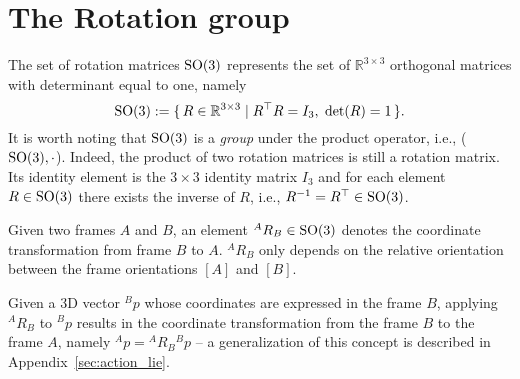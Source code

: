 \section{The Rotation group \label{sec:so3}}
The set of rotation matrices $\mathrm{SO}(3)$ represents the set of $\mathbb{R}^{3 \times 3}$ orthogonal matrices with determinant equal to one, namely
\begin{equation}
\label{eq:so3_definition}
\mathrm{SO}(3) :=  \{\, R \in \mathbb{R}^{3 \times 3} \mid R^\top R = I_3 , \hspace{0.3em} \operatorname{det}(R) = 1 \,\}.
\end{equation}
It is worth noting that $\mathrm{SO}(3)$ is a \emph{group} under the product operator, i.e., ($\mathrm{SO}(3), \cdot$). Indeed, the product of two rotation matrices is still a rotation matrix. 
Its identity element is the $3\times3$ identity matrix $I_3$ and for each element $R\in \mathrm{SO}(3)$ there exists the inverse of $R$, i.e., $R^{-1} = R^\top \in \mathrm{SO}(3)$.
\par
Given two frames $A$ and $B$, an element ${}^A R _B \in \mathrm{SO}(3)$ denotes the coordinate transformation from frame $B$ to $A$. ${}^A R _B$ only depends on the relative orientation between the frame orientations $[A]$ and $[B]$.
\par
Given a 3D vector ${}^B p$ whose coordinates are expressed in the frame $B$, applying ${}^A R _B$ to ${}^B p$ results in the coordinate transformation from the frame $B$ to the frame $A$, namely ${}^A p = {}^A R _B {}^B p$ -- a generalization of this concept is described in Appendix~\ref{sec:action_lie}.

